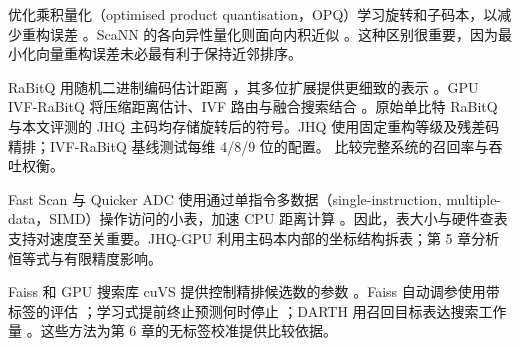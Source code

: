 优化乘积量化（optimised product quantisation，OPQ）学习旋转和子码本，以减少重构误差 \cite{opq}。ScaNN 的各向异性量化则面向内积近似 \cite{scann}。这种区别很重要，因为最小化向量重构误差未必最有利于保持近邻排序。

RaBitQ 用随机二进制编码估计距离 \cite{rabitq}，其多位扩展提供更细致的表示 \cite{rabitq_multi}。GPU IVF-RaBitQ 将压缩距离估计、IVF 路由与融合搜索结合 \cite{ivfrabitq}。原始单比特 RaBitQ 与本文评测的 JHQ 主码均存储旋转后的符号。JHQ 使用固定重构等级及残差码精排；IVF-RaBitQ 基线测试每维 4/8/9 位的配置。 比较完整系统的召回率与吞吐权衡。

Fast Scan 与 Quicker ADC 使用通过单指令多数据（single-instruction, multiple-data，SIMD）操作访问的小表，加速 CPU 距离计算 \cite{fastscan,quickeradc}。因此，表大小与硬件查表支持对速度至关重要。JHQ-GPU 利用主码本内部的坐标结构拆表；第 5 章分析恒等式与有限精度影响。

Faiss 和 GPU 搜索库 cuVS 提供控制精排候选数的参数 \cite{faiss_refine,cuvs_refinement}。Faiss 自动调参使用带标签的评估 \cite{faiss_autotune}；学习式提前终止预测何时停止 \cite{li_termination}；DARTH 用召回目标表达搜索工作量 \cite{darth}。这些方法为第 6 章的无标签校准提供比较依据。
